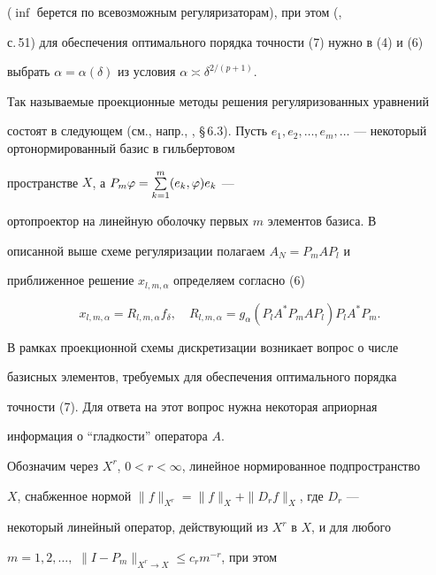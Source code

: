 ($\inf$ берется по всевозможным  регуляризаторам), при этом (\cite{VV},


с.\,51) для обеспечения оптимального порядка точности (7) нужно в (4) и  (6)


выбрать $\alpha=\alpha(\delta)$ из условия $\alpha\asymp\delta^{2/(p+1)}$.





Так называемые проекционные методы решения регуляризованных уравнений


состоят в следующем (см., напр., \cite{IVT}, \S\,6.3). Пусть $e_1, e_2,


\dotsc,e_m,\dotsc$ ---  некоторый ортонормированный базис в гильбертовом


пространстве $X$, а $P_m\varphi = \sum\limits_{k=1}^m (e_k,\varphi)e_k$  ---


ортопроектор на линейную оболочку  первых $m$ элементов базиса. В


описанной выше схеме регуляризации полагаем $A_N=P_mAP_l$ и


приближенное решение $x_{l,m,\alpha}$ определяем согласно (6)


\begin{equation}


x_{l,m,\alpha} = R_{l,m,\alpha}f_\delta, \quad


R_{l,m,\alpha} = g_\alpha(P_lA^*P_mAP_l)P_lA^*P_m.


\end{equation}





В рамках проекционной схемы дискретизации возникает вопрос о числе


базисных элементов, требуемых для обеспечения оптимального порядка


точности (7). Для ответа на этот вопрос нужна некоторая  априорная


информация о ``гладкости'' оператора $A$.





Обозначим через $X^r$, $0<r<\infty$, линейное нормированное подпространство


$X$, снабженное нормой $\|f\|_{X^r} = \|f\|_X + \|D_r f\|_X$, где $D_r$  ---


некоторый линейный оператор, действующий из $X^r$  в $X$, и для любого


$m=1,2,\dotsc,$\; $\|I-P_m\|_{X^r\to X}\le c_rm^{-r}$, при этом


